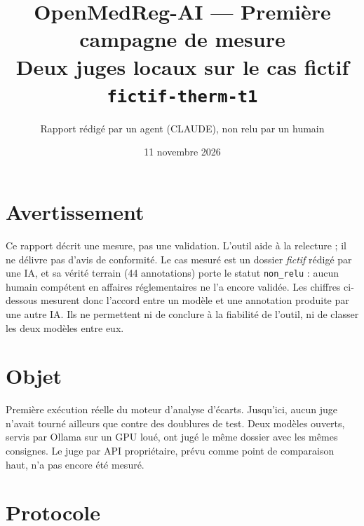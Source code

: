 \documentclass[11pt,a4paper]{article}
\title{OpenMedReg-AI --- Première campagne de mesure\\
\large Deux juges locaux sur le cas fictif \texttt{fictif-therm-t1}}
\author{Rapport rédigé par un agent (CLAUDE), non relu par un humain}
\date{11 novembre 2026}
\begin{document}
\maketitle

\section*{Avertissement}

Ce rapport décrit une mesure, pas une validation. L'outil aide à la
relecture ; il ne délivre pas d'avis de conformité. Le cas mesuré est un
dossier \emph{fictif} rédigé par une IA, et sa vérité terrain (44
annotations) porte le statut \texttt{non\_relu} : aucun humain compétent en
affaires réglementaires ne l'a encore validée. Les chiffres ci-dessous
mesurent donc l'accord entre un modèle et une annotation produite par une
autre IA. Ils ne permettent ni de conclure à la fiabilité de l'outil, ni de
classer les deux modèles entre eux.

\section{Objet}

Première exécution réelle du moteur d'analyse d'écarts. Jusqu'ici, aucun
juge n'avait tourné ailleurs que contre des doublures de test. Deux modèles
ouverts, servis par Ollama sur un GPU loué, ont jugé le même dossier avec
les mêmes consignes. Le juge par API propriétaire, prévu comme point de
comparaison haut, n'a pas encore été mesuré.

\section{Protocole}
\end{document}

